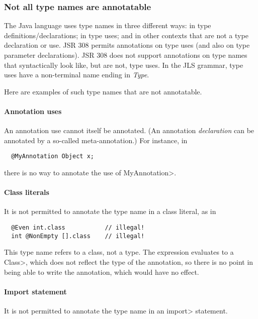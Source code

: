 \documentclass[10pt]{article}
\newcommand{\preverbnegspace}{\vspace{-5pt}}
\begin{document}
\subsubsection{Not all type names are annotatable\label{type-names}}

The Java language uses type names in three different ways:  in type
definitions/declarations; in type uses; and in other contexts that are not
a type declaration or use.  JSR 308 permits annotations on type uses (and
also on type parameter declarations).  JSR 308 does not support annotations
on type names that syntactically look like, but are not, type uses.
In the JLS grammar, type uses have a non-terminal name ending in
\emph{Type}.

Here are examples of such type names that are not annotatable.

\paragraph{Annotation uses}
An annotation use cannot itself be annotated.  (An annotation \emph{declaration}
can be annotated by a so-called meta-annotation.)
For instance, in

\preverbnegspace
\begin{Verbatim}
  @MyAnnotation Object x;
\end{Verbatim}
\preverbnegspace

\noindent
there is no way to annotate the use of \<MyAnnotation>.

\paragraph{Class literals}
It is not permitted to annotate the type name in a class literal, as in

\preverbnegspace
\begin{Verbatim}
  @Even int.class           // illegal!
  int @NonEmpty [].class    // illegal!
\end{Verbatim}
\preverbnegspace

\noindent
This type name refers to a class, not a type.  The expression evaluates to a
\<Class>, which does not reflect the type of the annotation, so there is no
point in being able to write the annotation, which would have no effect.

\paragraph{Import statement}
It is not permitted to annotate the type name in an \<import> statement.
\end{document}
